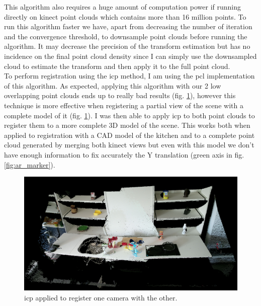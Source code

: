 This algorithm also requires a huge amount of computation power if running directly on kinect point clouds which contains more than 16 million points. To run this algorithm faster we have, apart from decreasing the number of iteration and the convergence threshold, to downsample point clouds before running the algorithm. It may decrease the precision of the transform estimation but has no incidence on the final point cloud density since I can simply use the downsampled cloud to estimate the transform and then apply it to the full point cloud.\\
\newline
To perform registration using the \acrshort{icp} method, I am using the \acrshort{pcl} implementation of this algorithm. As expected, applying this algorithm with our 2 low overlapping point clouds ends up to really bad results (fig. \ref{fig:icp_cams}), however this technique is more effective when registering a partial view of the scene with a complete model of it (fig. \ref{fig:icp_cams}). I was then able to apply \acrshort{icp} to both point clouds to register them to a more complete 3D model of the scene. This works both when applied to registration with a CAD model of the kitchen and to a complete point cloud generated by merging both kinect views but even with this model we don't have enough information to fix accurately the Y translation (green axis in fig. \ref{fig:ar_marker}). \\

\begin{figure}[h!]
    \centering
    \includegraphics[width=\textwidth]{images/icp_one_one_registration.png}
    \caption{\acrshort{icp} applied to register one camera with the other.}
    \label{fig:icp_cams}
\end{figure}

